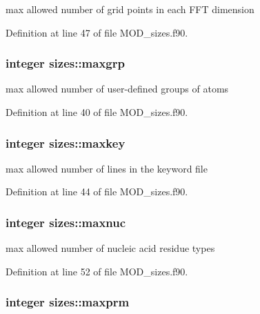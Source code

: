 max allowed number of grid points in each F\-F\-T dimension 



Definition at line 47 of file M\-O\-D\-\_\-sizes.\-f90.

\hypertarget{classsizes_ac1a20b194d028ae26605ec39508deaf0}{
\subsubsection[{maxgrp}]{\setlength{\rightskip}{0pt plus 5cm}integer sizes\-::maxgrp}}\label{classsizes_ac1a20b194d028ae26605ec39508deaf0}


max allowed number of user-\/defined groups of atoms 



Definition at line 40 of file M\-O\-D\-\_\-sizes.\-f90.

\hypertarget{classsizes_a8bd1bf65d886678e4c994f8d94788ea8}{
\subsubsection[{maxkey}]{\setlength{\rightskip}{0pt plus 5cm}integer sizes\-::maxkey}}\label{classsizes_a8bd1bf65d886678e4c994f8d94788ea8}


max allowed number of lines in the keyword file 



Definition at line 44 of file M\-O\-D\-\_\-sizes.\-f90.

\hypertarget{classsizes_a2e996c0025a791309d434835ff499a3c}{
\subsubsection[{maxnuc}]{\setlength{\rightskip}{0pt plus 5cm}integer sizes\-::maxnuc}}\label{classsizes_a2e996c0025a791309d434835ff499a3c}


max allowed number of nucleic acid residue types 



Definition at line 52 of file M\-O\-D\-\_\-sizes.\-f90.

\hypertarget{classsizes_aa6c672f18d75f431f58947d63d9bd470}{
\subsubsection[{maxprm}]{\setlength{\rightskip}{0pt plus 5cm}integer sizes\-::maxprm}}\label{classsizes_aa6c672f18d75f431f58947d63d9bd470}


